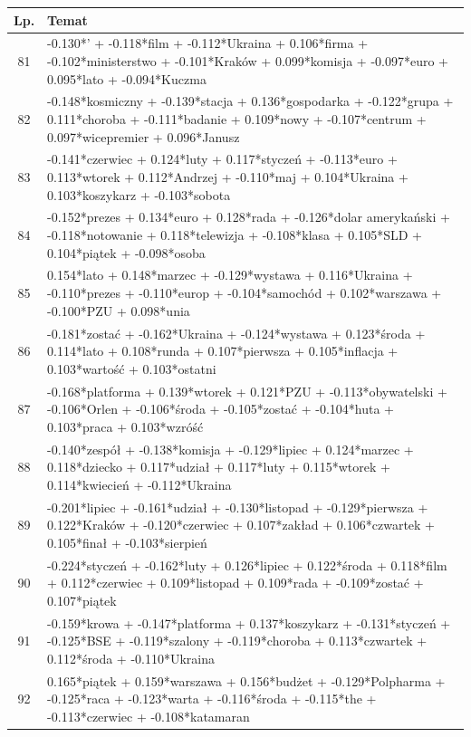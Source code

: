 \documentclass[11pt,a4paper]{article}
\begin{document}
\begin{table}[h]
\begin{tabular}{|c|>{\footnotesize}p{\linewidth}|}
\hline
Lp. & Temat \\\hline

81 & -0.130*' + -0.118*film + -0.112*Ukraina + 0.106*firma + -0.102*ministerstwo + -0.101*Kraków + 0.099*komisja + -0.097*euro + 0.095*lato + -0.094*Kuczma\\\hline
82 & -0.148*kosmiczny + -0.139*stacja + 0.136*gospodarka + -0.122*grupa + 0.111*choroba + -0.111*badanie + 0.109*nowy + -0.107*centrum + 0.097*wicepremier + 0.096*Janusz\\\hline
83 & -0.141*czerwiec + 0.124*luty + 0.117*styczeń + -0.113*euro + 0.113*wtorek + 0.112*Andrzej + -0.110*maj + 0.104*Ukraina + 0.103*koszykarz + -0.103*sobota\\\hline
84 & -0.152*prezes + 0.134*euro + 0.128*rada + -0.126*dolar amerykański + -0.118*notowanie + 0.118*telewizja + -0.108*klasa + 0.105*SLD + 0.104*piątek + -0.098*osoba\\\hline
85 & 0.154*lato + 0.148*marzec + -0.129*wystawa + 0.116*Ukraina + -0.110*prezes + -0.110*europ + -0.104*samochód + 0.102*warszawa + -0.100*PZU + 0.098*unia\\\hline
86 & -0.181*zostać + -0.162*Ukraina + -0.124*wystawa + 0.123*środa + 0.114*lato + 0.108*runda + 0.107*pierwsza + 0.105*inflacja + 0.103*wartość + 0.103*ostatni\\\hline
87 & -0.168*platforma + 0.139*wtorek + 0.121*PZU + -0.113*obywatelski + -0.106*Orlen + -0.106*środa + -0.105*zostać + -0.104*huta + 0.103*praca + 0.103*wzróść\\\hline
88 & -0.140*zespół + -0.138*komisja + -0.129*lipiec + 0.124*marzec + 0.118*dziecko + 0.117*udział + 0.117*luty + 0.115*wtorek + 0.114*kwiecień + -0.112*Ukraina\\\hline
89 & -0.201*lipiec + -0.161*udział + -0.130*listopad + -0.129*pierwsza + 0.122*Kraków + -0.120*czerwiec + 0.107*zakład + 0.106*czwartek + 0.105*finał + -0.103*sierpień\\\hline
90 & -0.224*styczeń + -0.162*luty + 0.126*lipiec + 0.122*środa + 0.118*film + 0.112*czerwiec + 0.109*listopad + 0.109*rada + -0.109*zostać + 0.107*piątek\\\hline
91 & -0.159*krowa + -0.147*platforma + 0.137*koszykarz + -0.131*styczeń + -0.125*BSE + -0.119*szalony + -0.119*choroba + 0.113*czwartek + 0.112*środa + -0.110*Ukraina\\\hline
92 & 0.165*piątek + 0.159*warszawa + 0.156*budżet + -0.129*Polpharma + -0.125*raca + -0.123*warta + -0.116*środa + -0.115*the + -0.113*czerwiec + -0.108*katamaran\\\hline

\end{tabular}
\end{table}
\end{document}
